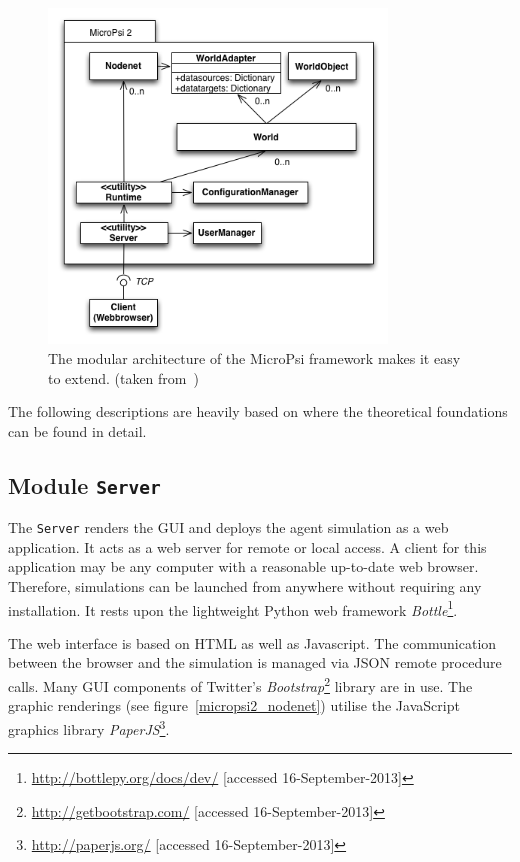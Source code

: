 \begin{figure}[h]
  \centering
    \includegraphics[width=9cm]{graphics/UML_MicroPsi_v14}
  \caption[The modular architecture of the MicroPsi framework]{The modular architecture of the MicroPsi framework makes it easy to extend. (taken from~\cite{conf/agi/Bach12})}
  \label{micropsi2_modules}
\end{figure}

The following descriptions are heavily based on \cite{conf/agi/Bach12} where the theoretical foundations can be found in detail.

        \subsection{Module \texttt{Server}}
The \texttt{Server} renders the GUI and deploys the agent simulation as a web application. It acts as a web server for remote or local access. A client for this application may be any computer with a reasonable up-to-date web browser. Therefore, simulations can be launched from anywhere without requiring any installation. It rests upon the lightweight Python web framework \emph{Bottle}\footnote{\url{http://bottlepy.org/docs/dev/} [accessed 16-September-2013]}.

The web interface is based on HTML as well as Javascript. The communication between the browser and the simulation is managed via JSON remote procedure calls. Many GUI components of Twitter's \emph{Bootstrap}\footnote{\url{http://getbootstrap.com/} [accessed 16-September-2013]} library are in use. The graphic renderings (see figure~\ref{micropsi2_nodenet}) utilise the JavaScript graphics library \emph{PaperJS}\footnote{\url{http://paperjs.org/} [accessed 16-September-2013]}. 

